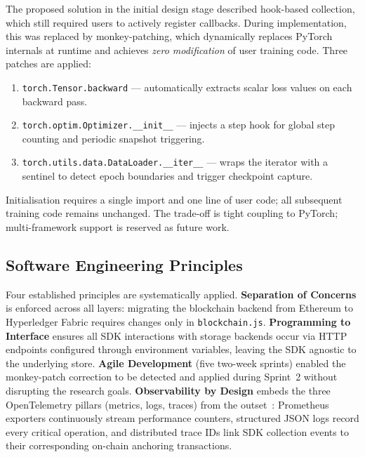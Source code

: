 \documentclass[10pt,twocolumn]{article}
\begin{document}
The proposed solution in the initial design stage described hook-based collection, which
still required users to actively register callbacks. During implementation, this was
replaced by monkey-patching, which dynamically replaces PyTorch internals at runtime
and achieves \emph{zero modification} of user training code. Three patches are applied:

\begin{enumerate}[leftmargin=*, nosep]
  \item \texttt{torch.Tensor.backward} --- automatically extracts scalar loss values on
        each backward pass.
  \item \texttt{torch.optim.Optimizer.\_\_init\_\_} --- injects a step hook for global step
        counting and periodic snapshot triggering.
  \item \texttt{torch.utils.data.DataLoader.\_\_iter\_\_} --- wraps the iterator with a
        sentinel to detect epoch boundaries and trigger checkpoint capture.
\end{enumerate}

Initialisation requires a single import and one line of user code; all subsequent training
code remains unchanged. The trade-off is tight coupling to PyTorch; multi-framework
support is reserved as future work.

\subsection{Software Engineering Principles}

Four established principles are systematically applied. \textbf{Separation of Concerns}
is enforced across all layers: migrating the blockchain backend from Ethereum to
Hyperledger Fabric requires changes only in \texttt{blockchain.js}. \textbf{Programming
to Interface} ensures all SDK interactions with storage backends occur via HTTP endpoints
configured through environment variables, leaving the SDK agnostic to the underlying
store. \textbf{Agile Development} (five two-week sprints) enabled the monkey-patch
correction to be detected and applied during Sprint~2 without disrupting the research
goals. \textbf{Observability by Design} embeds the three OpenTelemetry pillars (metrics,
logs, traces) from the outset~\cite{janes2023}: Prometheus exporters continuously stream
performance counters, structured JSON logs record every critical operation, and distributed
trace IDs link SDK collection events to their corresponding on-chain anchoring
transactions.
\end{document}
